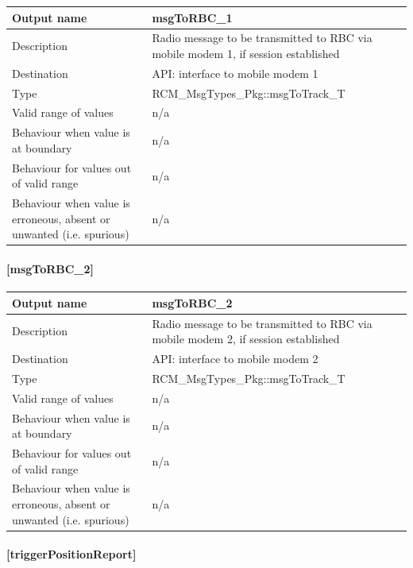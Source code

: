 \begin{longtable}{p{}p{}}
	\toprule
	Output name				& msgToRBC\_1 \\
	\midrule
	Description				& Radio message to be transmitted to RBC via mobile modem 1, if session established \\
	\midrule
	Destination				& API: interface to mobile modem 1 \\ 
	\midrule
	Type					& RCM\_MsgTypes\_Pkg::msgToTrack\_T \\
	\midrule
	Valid range of values	& n/a \\
	\midrule
	Behaviour when value is at boundary	& n/a \\
	\midrule
	Behaviour for values out of valid range	& n/a \\
	\midrule
	Behaviour when value is erroneous, absent or unwanted (i.e. spurious) & n/a \\
	\bottomrule
\end{longtable}

\paragraph{[msgToRBC\_2]}

\begin{longtable}{p{}p{}}
	\toprule
	Output name				& msgToRBC\_2 \\
	\midrule
	Description				& Radio message to be transmitted to RBC via mobile modem 2, if session established \\
	\midrule
	Destination				& API: interface to mobile modem 2 \\ 
	\midrule
	Type					& RCM\_MsgTypes\_Pkg::msgToTrack\_T \\
	\midrule
	Valid range of values	& n/a \\
	\midrule
	Behaviour when value is at boundary	& n/a \\
	\midrule
	Behaviour for values out of valid range	& n/a \\
	\midrule
	Behaviour when value is erroneous, absent or unwanted (i.e. spurious) & n/a \\
	\bottomrule
\end{longtable}

\paragraph{[triggerPositionReport]}

